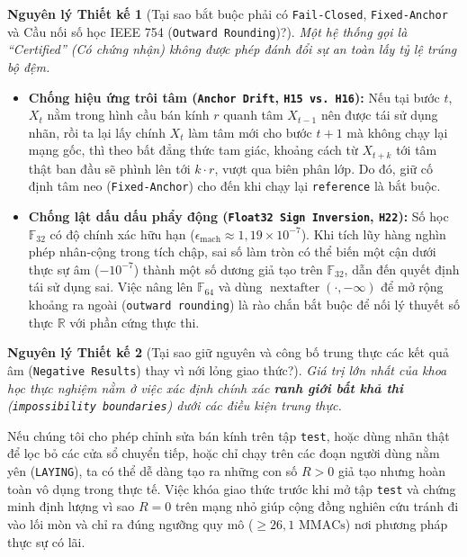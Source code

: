 \documentclass[11pt,a4paper]{article}
\newcommand{\R}{\mathbb{R}}
\newcommand{\F}{\mathbb{F}}
\newcommand{\code}[1]{{\small\ttfamily\nolinkurl{#1}}}
\newtheorem{principle}{Nguyên lý Thiết kế}[section]
\begin{document}
\begin{principle}[Tại sao bắt buộc phải có \code{Fail-Closed}, \code{Fixed-Anchor} và Cầu nối số học IEEE 754 (\code{Outward Rounding})?]
Một hệ thống gọi là ``Certified'' (Có chứng nhận) không được phép đánh đổi sự an toàn lấy tỷ lệ trúng bộ đệm.
\end{principle}
\begin{itemize}
  \item \textbf{Chống hiệu ứng trôi tâm (\code{Anchor Drift}, \code{H15 vs. H16}):} Nếu tại bước $t$, $X_t$ nằm trong hình cầu bán kính $r$ quanh tâm $X_{t-1}$ nên được tái sử dụng nhãn, rồi ta lại lấy chính $X_t$ làm tâm mới cho bước $t+1$ mà không chạy lại mạng gốc, thì theo bất đẳng thức tam giác, khoảng cách từ $X_{t+k}$ tới tâm thật ban đầu sẽ phình lên tới $k \cdot r$, vượt qua biên phân lớp. Do đó, giữ cố định tâm neo (\code{Fixed-Anchor}) cho đến khi chạy lại \code{reference} là bắt buộc.
  \item \textbf{Chống lật dấu dấu phẩy động (\code{Float32 Sign Inversion}, \code{H22}):} Số học $\F_{32}$ có độ chính xác hữu hạn ($\epsilon_{\text{mach}} \approx 1,19 \times 10^{-7}$). Khi tích lũy hàng nghìn phép nhân-cộng trong tích chập, sai số làm tròn có thể biến một cận dưới thực sự âm ($-10^{-7}$) thành một số dương giả tạo trên $\F_{32}$, dẫn đến quyết định tái sử dụng sai. Việc nâng lên $\F_{64}$ và dùng $\operatorname{nextafter}(\cdot, -\infty)$ để mở rộng khoảng ra ngoài (\code{outward rounding}) là rào chắn bắt buộc để nối lý thuyết số thực $\R$ với phần cứng thực thi.
\end{itemize}

\begin{principle}[Tại sao giữ nguyên và công bố trung thực các kết quả âm (\code{Negative Results}) thay vì nới lỏng giao thức?]
Giá trị lớn nhất của khoa học thực nghiệm nằm ở việc xác định chính xác \textbf{ranh giới bất khả thi} (\code{impossibility boundaries}) dưới các điều kiện trung thực.
\end{principle}
Nếu chúng tôi cho phép chỉnh sửa bán kính trên tập \code{test}, hoặc dùng nhãn thật để lọc bỏ các cửa sổ chuyển tiếp, hoặc chỉ chạy trên các đoạn người dùng nằm yên (\code{LAYING}), ta có thể dễ dàng tạo ra những con số $R > 0$ giả tạo nhưng hoàn toàn vô dụng trong thực tế. Việc khóa giao thức trước khi mở tập \code{test} và chứng minh định lượng vì sao $R=0$ trên mạng nhỏ giúp cộng đồng nghiên cứu tránh đi vào lối mòn và chỉ ra đúng ngưỡng quy mô ($\ge 26,1\text{ MMACs}$) nơi phương pháp thực sự có lãi.
\end{document}
